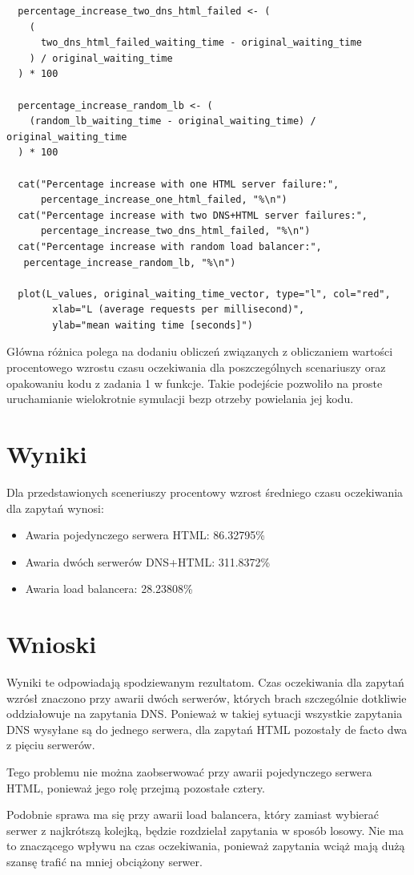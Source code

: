 \documentclass[12pt,oneside,a4paper]{book} %
\theoremstyle{break}
\begin{document}
\begin{small}
\begin{verbatim}
  percentage_increase_two_dns_html_failed <- (
    (
      two_dns_html_failed_waiting_time - original_waiting_time
    ) / original_waiting_time
  ) * 100
  
  percentage_increase_random_lb <- (
    (random_lb_waiting_time - original_waiting_time) / original_waiting_time
  ) * 100
  
  cat("Percentage increase with one HTML server failure:", 
      percentage_increase_one_html_failed, "%\n")
  cat("Percentage increase with two DNS+HTML server failures:", 
      percentage_increase_two_dns_html_failed, "%\n")
  cat("Percentage increase with random load balancer:",
   percentage_increase_random_lb, "%\n")
  
  plot(L_values, original_waiting_time_vector, type="l", col="red",
        xlab="L (average requests per millisecond)", 
        ylab="mean waiting time [seconds]")
\end{verbatim}
\end{small}

Główna różnica polega na dodaniu obliczeń związanych z obliczaniem wartości procentowego wzrostu czasu oczekiwania dla poszczególnych scenariuszy oraz opakowaniu kodu z zadania 1 w funkcje. Takie podejście pozwoliło na proste uruchamianie wielokrotnie symulacji bezp otrzeby powielania jej kodu.

\section*{Wyniki}

Dla przedstawionych sceneriuszy procentowy wzrost średniego czasu oczekiwania dla zapytań wynosi:
\begin{itemize}
  \item Awaria pojedynczego serwera HTML: 86.32795\%
  \item Awaria dwóch serwerów DNS+HTML: 311.8372\%
  \item Awaria load balancera: 28.23808\%
\end{itemize}

\section*{Wnioski}

Wyniki te odpowiadają spodziewanym rezultatom. Czas oczekiwania dla zapytań wzrósł znaczono przy awarii dwóch serwerów, których brach szczególnie dotkliwie oddziałowuje na zapytania DNS. Ponieważ w takiej sytuacji wszystkie zapytania DNS wysyłane są do jednego serwera, dla zapytań HTML pozostały de facto dwa z pięciu serwerów.

Tego problemu nie można zaobserwować przy awarii pojedynczego serwera HTML, ponieważ jego rolę przejmą pozostałe cztery.

Podobnie sprawa ma się przy awarii load balancera, który zamiast wybierać serwer z najkrótszą kolejką, będzie rozdzielał zapytania w sposób losowy. Nie ma to znaczącego wpływu na czas oczekiwania, ponieważ zapytania wciąż mają dużą szansę trafić na mniej obciążony serwer.
\end{document}
